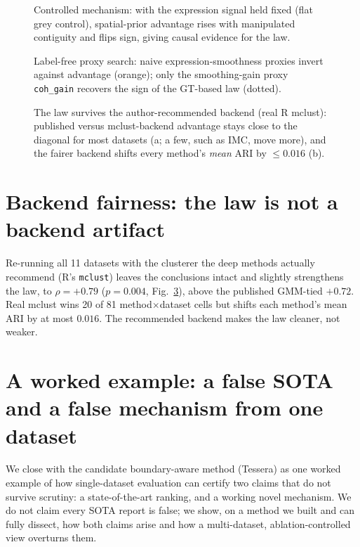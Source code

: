 \documentclass[journal]{IEEEtran}
\begin{document}
\begin{figure}[!t]\centering
\resizebox{\linewidth}{!}{}
\caption{Controlled mechanism: with the expression signal held fixed (flat grey control), spatial-prior
advantage rises with manipulated contiguity and flips sign, giving causal evidence for the law.}
\label{fig:mech}
\end{figure}

\begin{figure}[!t]\centering
\resizebox{\linewidth}{!}{}
\caption{Label-free proxy search: naive expression-smoothness proxies invert against advantage (orange);
only the smoothing-gain proxy \texttt{coh\_gain} recovers the sign of the GT-based law (dotted).}
\label{fig:proxy}
\end{figure}

\begin{figure}[!t]\centering
\resizebox{\linewidth}{!}{}
\caption{The law survives the author-recommended backend (real R mclust): published versus mclust-backend
advantage stays close to the diagonal for most datasets (a; a few, such as IMC, move more), and the fairer
backend shifts every method's \emph{mean} ARI by $\leq 0.016$ (b).}
\label{fig:backend}
\end{figure}

\section{Backend fairness: the law is not a backend artifact}
Re-running all 11 datasets with the clusterer the deep methods actually recommend (R's \texttt{mclust})
leaves the conclusions intact and slightly strengthens the law, to $\rho=+0.79$ ($p=0.004$,
Fig.~\ref{fig:backend}), above the published GMM-tied $+0.72$. Real mclust wins 20 of 81
method$\times$dataset cells but shifts each method's mean ARI by at most $0.016$. The recommended backend
makes the law cleaner, not weaker.

\section{A worked example: a false SOTA and a false mechanism from one dataset}\label{sec:tessera}
We close with the candidate boundary-aware method (Tessera) as one worked example of how single-dataset
evaluation can certify two claims that do not survive scrutiny: a state-of-the-art ranking, and a working
novel mechanism. We do not claim every SOTA report is false; we show, on a method we built and can fully
dissect, how both claims arise and how a multi-dataset, ablation-controlled view overturns them.
\end{document}

